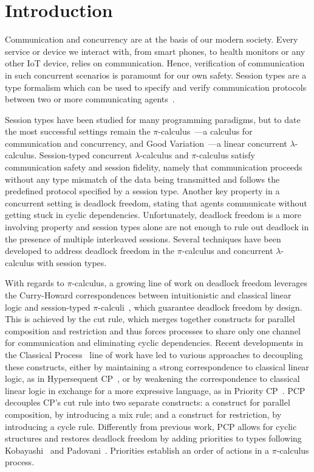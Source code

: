 \documentclass[main.tex]{subfiles}
\begin{document}
\section{Introduction}
Communication and concurrency are at the basis of our modern society. Every service or device we interact with, from smart phones, to health monitors or any other IoT device, relies on communication. Hence, verification of communication in such concurrent scenarios is paramount for our own safety. Session types are a type formalism which can be used to specify and verify communication protocols between two or more communicating agents~\cite{honda93,takeuchihonda94,hondavasconcelos98,carbonehonda07}.

Session types have been studied for many programming paradigms, but to date the most successful settings remain the $\pi$-calculus~\cite{sangiorgiwalker01}---a calculus for communication and concurrency, and Good Variation~\cite[GV]{wadler15,lindleymorris15}---a linear concurrent $\lambda$-calculus.
Session-typed concurrent $\lambda$-calculus and $\pi$-calculus satisfy communication safety and session fidelity, namely that communication proceeds without any type mismatch of the data being transmitted and follows the predefined protocol specified by a session type.
Another key property in a concurrent setting is deadlock freedom, stating that agents communicate without getting stuck in cyclic dependencies. Unfortunately, deadlock freedom is a more involving property and session types alone are not enough to rule out deadlock in the presence of multiple interleaved sessions. Several techniques have been developed to address deadlock freedom in the $\pi$-calculus and concurrent $\lambda$-calculus with session types.

With regards to $\pi$-calculus, a growing line of work on deadlock freedom leverages the Curry-Howard correspondences between intuitionistic and classical linear logic and session-typed $\pi$-calculi~\cite{cairespfenning10,wadler12}, which guarantee deadlock freedom by design. This is achieved by the cut rule, which merges together constructs for parallel composition and restriction and thus forces processes to share only one channel for communication and eliminating cyclic dependencies. Recent developments in the Classical Process~\cite[CP]{wadler12} line of work have led to various approaches to decoupling these constructs, either by maintaining a strong correspondence to classical linear logic, as in Hypersequent CP~\cite[HCP]{kokkemontesi19popl,kokkemontesi19tlla}, or by weakening the correspondence to classical linear logic in exchange for a more expressive language, as in Priority CP~\cite[PCP]{dardhagay18}. PCP decouples CP's cut rule into two separate constructs: a construct for parallel composition, by introducing a mix rule; and a construct for restriction, by introducing a cycle rule. Differently from previous work, PCP allows for cyclic structures and restores deadlock freedom by adding priorities to types following Kobayashi~\cite{kobayashi06} and Padovani~\cite{padovani14}. Priorities establish an order of actions in a $\pi$-calculus process.
\end{document}
